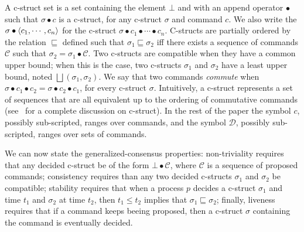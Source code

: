A c-struct set is a set containing the element $\bot$ and with an append operator $\bullet$ such that $\sigma \bullet c$ is a c-struct, for any c-struct $\sigma$ and command $c$. 
We also write the $\sigma\bullet\left\langle c_1,\cdots,c_n\right\rangle$ for the c-struct $\sigma\bullet c_1\bullet\cdots\bullet c_n$.
C-structs are partially ordered by the relation $\sqsubseteq$ defined such that $\sigma_1\sqsubseteq\sigma_2$ iff there exists a sequence of commands $\mathcal{C}$ such that $\sigma_2=\sigma_1\bullet \mathcal{C}$. Two c-structs are compatible when they have a common upper bound; when this is the case, two c-structs $\sigma_1$ and $\sigma_2$ have a least upper bound, noted $\bigsqcup\left( \sigma_1,\sigma_2 \right)$.
We say that two commands \textit{commute} when $\sigma\bullet c_1\bullet c_2 =  \sigma\bullet c_2\bullet c_1 $, for every c-struct $\sigma$. Intuitively, a c-struct represents a set of sequences that are all equivalent up to the ordering of commutative commands (see~\cite{Lamport05GeneralizeConsensus} for a complete discussion on c-struct). 
In the rest of the paper the symbol $c$, possibly sub-scripted, ranges over commands, and the symbol $\mathcal{D}$, possibly sub-scripted, ranges over sets of commands.

We can now state the generalized-consensus properties: non-triviality requires that any decided c-struct be of the form $\bot\bullet \mathcal{C}$, where $\mathcal{C}$ is a sequence of proposed commands; consistency requires than any two decided c-structs $\sigma_1$ and $\sigma_2$ be compatible; stability requires that when a process $p$ decides a c-struct $\sigma_1$ and time $t_1$ and $\sigma_2$ at time $t_2$, then $t_1 \leq t_2$ implies that $\sigma_1\sqsubseteq \sigma_2$; finally, liveness requires that
if a command keeps beeing proposed, then a c-struct $\sigma$ containing the command is eventually decided.


